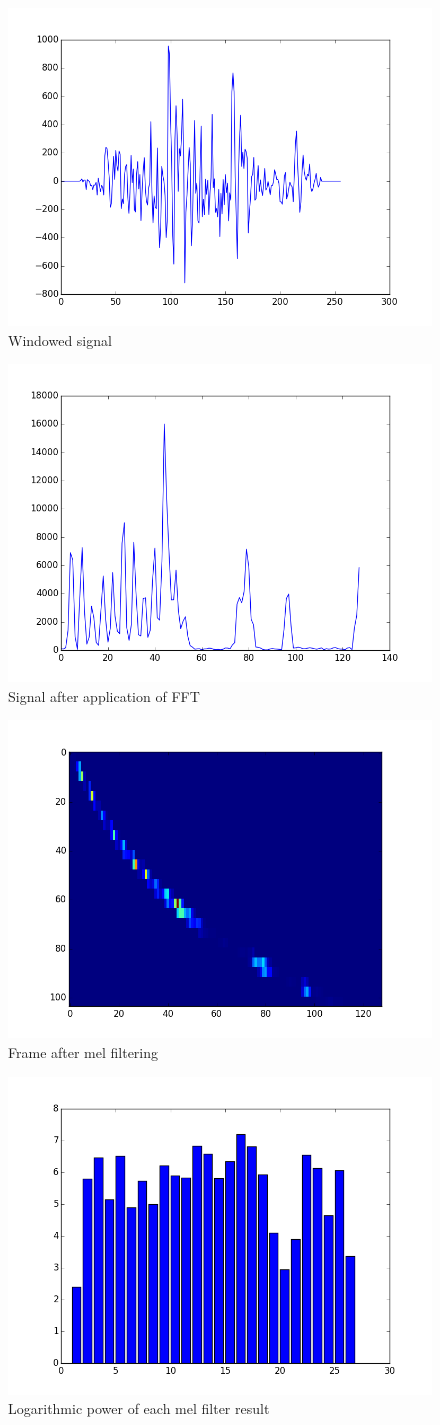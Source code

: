 \documentclass[magister]{dyplom}
\begin{document}
	\begin{figure}[!th]
		\centering
		\includegraphics[width=0.5\linewidth]{images/simulation/PAR_004_windowed_signal}
		\caption{Windowed signal}
		\label{fig:PAR_004_windowed_signal}
	\end{figure}

	\begin{figure}[!th]
		\centering
		\includegraphics[width=0.5\linewidth]{images/simulation/PAR_005_after_fft_signal}
		\caption{Signal after application of \gls{FFT}}
		\label{fig:PAR_005_after_fft_signal}
	\end{figure}

	\begin{figure}[!th]
		\centering
		\includegraphics[width=0.5\linewidth]{images/simulation/PAR_006_mel_filtered_signal}
		\caption{Frame after mel filtering}
		\label{fig:PAR_006_mel_filtered_signal}
	\end{figure}

	\begin{figure}[!th]
		\centering
		\includegraphics[width=0.5\linewidth]{images/simulation/PAR_007_mel_power_signal}
		\caption{Logarithmic power of each mel filter result}
		\label{fig:PAR_007_mel_power_signal}
	\end{figure}
\end{document}
